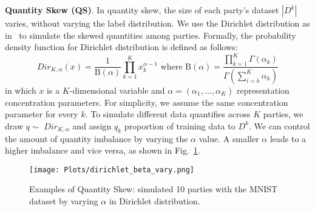 \documentclass[conference]{IEEEtran}
\newcommand{\partitle}[1]{\smallskip \noindent \textbf{#1}.}
\begin{document}
\partitle{Quantity Skew (QS)} In quantity skew, the size of each party's dataset $|D^k|$ varies, without varying the label distribution. We use the Dirichlet distribution as in~\cite{DistImabalance2019, DistLabelWang2020,DistLabelQinbin2021,Silos2021} to simulate the skewed quantities among parties. 
Formally, the probability density function for Dirichlet distribution is defined as follows:
\begin{equation}
 Dir_{K,\alpha}(x)= \frac{1}{\mathrm{B}(\alpha )} \prod_{k=1}^{K} x_{k}^{\alpha -1} \text{ where } \mathrm{B}(\alpha)= \frac{\prod_{k=1}^{K}\Gamma (\alpha_{k}) }{\Gamma (\sum_{i=k}^{K}\alpha_{k})}
\end{equation}
in which $x$ is a $K$-dimensional variable and $\alpha =(\alpha_{1},...,\alpha_{K})$ representation concentration parameters. For simplicity, we assume the same concentration parameter for every $k$. To simulate different data quantifies across $K$ parties, we draw $q \sim$ $Dir_{K,\alpha}$ and assign $q_{k}$ proportion of training data to $D^k$. We can control the amount of quantity imbalance by varying the $\alpha$ value. A smaller $\alpha$ leads to a higher imbalance and vice versa, as shown in Fig.~\ref{fig:dirichlet_beta_vary}. 



\begin{figure}
 \centering
 \texttt{[image: Plots/dirichlet\_beta\_vary.png]}
 \caption{Examples of Quantity Skew: simulated 10 parties with the MNIST dataset by varying $\alpha$ in Dirichlet distribution.}

 \label{fig:dirichlet_beta_vary}
\end{figure}

\end{document}
